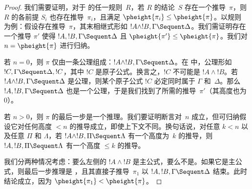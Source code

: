 \documentclass[../../../include/open-logic-section]{subfiles}
\begin{document}
\begin{proof}
我们需要证明，对于  的任一规则~$R$，若 $R$ 的结论~$S$ 存在一个推导~$\pi$，则 $R$ 的各前提 $S_i$ 也存在推导~$\pi_i$，且满足 $\pheight{\pi_i}
\le \pheight{\pi}$。以规则 \LeftR{\land} 为例：假设存在推导~$\pi$，其末相继式形如 $!A \land !B, \Gamma \Sequent \Delta$。我们需证明存在一个推导 $\pi'$ 使得 $!A, !B, \Gamma \Sequent \Delta$ 且 $\pheight{\pi'} \le \pheight{\pi}$。我们对 $n = \pheight{\pi}$ 进行归纳。

若 $n = 0$，则 $\pi$ 仅由一条公理组成：$!A \land !B, \Gamma \Sequent \Delta$。在  中，公理形如 $!C, \Gamma \Sequent \Delta, !C$，其中 $!C$ 是原子公式。换言之，$!C$ 不可能是 $!A \land !B$。若 $!A \land !B, \Gamma \Sequent \Delta$ 是公理，则某个原子公式 $!C$ 必定同时属于 $\Gamma$ 和~$\Delta$。那么 $!A, !B, \Gamma \Sequent \Delta$ 也是一个公理，于是我们找到了所需的推导~$\pi'$（其高度也为~$0$）。

若 $n>0$，则 $\pi$ 的最后一步是一个推理。我们要证明断言对~$n$ 成立，但可归纳假设它对任何高度 $<n$ 的推导成立，即使上下文不同。换句话说，对任意 $k<n$ 以及任意 $\Pi$ 和 $\Lambda$，若 $!A \land !B, \Pi \Sequent \Lambda$ 有一个高度为~$k$ 的推导，则 $!A, !B, \Pi \Sequent \Lambda$ 有一个高度 $\le k$ 的推导。

我们分两种情况考虑：要么左侧的 $!A \land !B$ 是主公式，要么不是。如果它是主公式，则最后一步推理是 \LeftR{\land}，且其直接子推导~$\pi_1$ 以 $!A, !B, \Gamma \Sequent \Delta$ 结束。此时结论成立，因为 $\pheight{\pi_1} < \pheight{\pi}$。


\end{proof}
\end{document}
